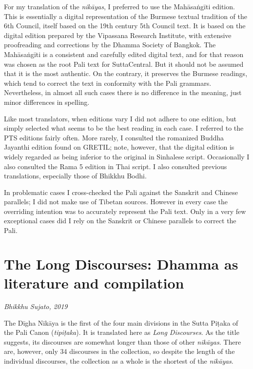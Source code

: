 \documentclass[12pt,openany]{book}%
\newcommand*{\scbyline}[1]{\begin{flushright}\textit{#1}\end{flushright}\bigskip}
\begin{document}
For my translation of the \textit{\textsanskrit{nikāyas}}, I preferred to use the \textsanskrit{Mahāsaṅgīti} edition. This is essentially a digital representation of the Burmese textual tradition of the 6th Council, itself based on the 19th century 5th Council text. It is based on the digital edition prepared by the Vipassana Research Institute, with extensive proofreading and corrections by the Dhamma Society of Bangkok. The \textsanskrit{Mahāsaṅgīti} is a consistent and carefully edited digital text, and for that reason was chosen as the root Pali text for SuttaCentral. But it should not be assumed that it is the most authentic. On the contrary, it preserves the Burmese readings, which tend to correct the text in conformity with the Pali grammars. Nevertheless, in almost all such cases there is no difference in the meaning, just minor differences in spelling.

Like most translators, when editions vary I did not adhere to one edition, but simply selected what seems to be the best reading in each case. I referred to the PTS editions fairly often. More rarely, I consulted the romanized Buddha Jayanthi edition found on GRETIL; note, however, that the digital edition is widely regarded as being inferior to the original in Sinhalese script. Occasionally I also consulted the Rama 5 edition in Thai script. I also consulted previous translations, especially those of Bhikkhu Bodhi.

In problematic cases I cross-checked the Pali against the Sanskrit and Chinese parallels; I did not make use of Tibetan sources. However in every case the overriding intention was to accurately represent the Pali text. Only in a very few exceptional cases did I rely on the Sanskrit or Chinese parallels to correct the Pali.

%
\chapter*{The Long Discourses: Dhamma as literature and compilation}

\scbyline{Bhikkhu Sujato, 2019}

The \textsanskrit{Dīgha} \textsanskrit{Nikāya} is the first of the four main divisions in the Sutta \textsanskrit{Piṭaka} of the Pali Canon (\textit{\textsanskrit{tipiṭaka}}). It is translated here as \textit{Long Discourses}. As the title suggests, its discourses are somewhat longer than those of other \textit{\textsanskrit{nikāyas}}. There are, however, only 34 discourses in the collection, so despite the length of the individual discourses, the collection as a whole is the shortest of the \textit{\textsanskrit{nikāyas}}.
\end{document}
